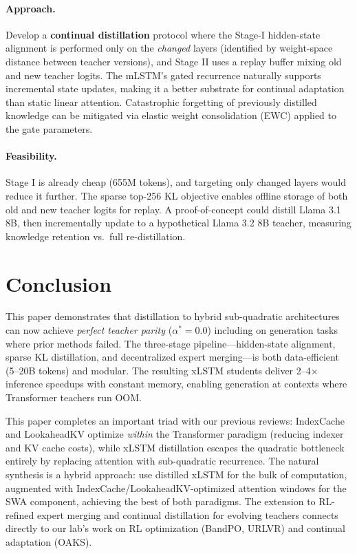 \documentclass[11pt]{article}
\begin{document}
\paragraph{Approach.}
Develop a \textbf{continual distillation} protocol where the Stage-I hidden-state alignment is performed only on the \emph{changed} layers (identified by weight-space distance between teacher versions), and Stage II uses a replay buffer mixing old and new teacher logits.
The mLSTM's gated recurrence naturally supports incremental state updates, making it a better substrate for continual adaptation than static linear attention.
Catastrophic forgetting of previously distilled knowledge can be mitigated via elastic weight consolidation (EWC) applied to the gate parameters.

\paragraph{Feasibility.}
Stage I is already cheap (655M tokens), and targeting only changed layers would reduce it further.
The sparse top-256 KL objective enables offline storage of both old and new teacher logits for replay.
A proof-of-concept could distill Llama 3.1 8B, then incrementally update to a hypothetical Llama 3.2 8B teacher, measuring knowledge retention vs.\ full re-distillation.

\section{Conclusion}

This paper demonstrates that distillation to hybrid sub-quadratic architectures can now achieve \emph{perfect teacher parity} ($\alpha^* = 0.0$) including on generation tasks where prior methods failed.
The three-stage pipeline---hidden-state alignment, sparse KL distillation, and decentralized expert merging---is both data-efficient (5--20B tokens) and modular.
The resulting xLSTM students deliver 2--4$\times$ inference speedups with constant memory, enabling generation at contexts where Transformer teachers run OOM.

This paper completes an important triad with our previous reviews: IndexCache and LookaheadKV optimize \emph{within} the Transformer paradigm (reducing indexer and KV cache costs), while xLSTM distillation escapes the quadratic bottleneck entirely by replacing attention with sub-quadratic recurrence.
The natural synthesis is a hybrid approach: use distilled xLSTM for the bulk of computation, augmented with IndexCache/LookaheadKV-optimized attention windows for the SWA component, achieving the best of both paradigms.
The extension to RL-refined expert merging and continual distillation for evolving teachers connects directly to our lab's work on RL optimization (BandPO, URLVR) and continual adaptation (OAKS).
\end{document}
